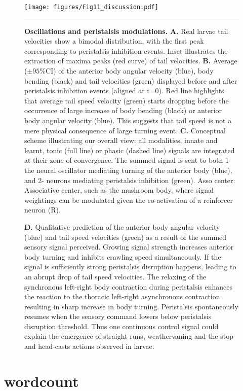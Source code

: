 \documentclass[11pt,a4paper]{article}
\begin{document}
\begin{figure}
\begin{center}
\texttt{[image: figures/Fig11\_discussion.pdf]}
\caption{{\bf Oscillations and peristalsis modulations.} {\bf A.} Real larvae tail velocities show a bimodal distribution, with the first peak corresponding to peristalsis inhibition events. Inset illustrates the extraction of maxima peaks (red curve) of tail velocities.
{\bf B.} Average ($\pm 95\%$CI) of the anterior body angular velocity (blue), body bending (black) and tail velocities (green) displayed before and after peristalsis inhibition events (aligned at t=0). Red line highlights that average tail speed velocity (green) starts dropping before the occurrence of large increase of body bending (black) or anterior body angular velocity (blue). This suggests that tail speed is not a mere physical consequence of large turning event.
{\bf C.} Conceptual scheme illustrating our overall view: all modalities, innate and learnt, tonic (full line) or phasic (dashed line) signals are integrated at their zone of convergence. The summed signal is sent to both 1-the  neural oscillator mediating turning of the anterior body (blue), and 2- neurons mediating peristalsis inhibition (green). Asso center: Associative center, such as the mushroom body, where signal weightings can be modulated given the co-activation of a reinforcer neuron (R).
\label{fig:Peristalsis}}
\hrule
\end{center}
\end{figure}



\begin{figure}
\ContinuedFloat
\caption{
{\bf D.} Qualitative prediction of the anterior body angular velocity (blue) and tail speed velocities (green) as a result of the summed sensory signal perceived. Growing signal strength increases anterior body turning and inhibits crawling speed simultaneously. If the signal is sufficiently strong peristalsis disruption happens, leading to an abrupt drop of tail speed velocities. The relaxing of the synchronous left-right body contraction during peristalsis enhances the reaction to the thoracic left-right asynchronous contraction resulting in sharp increase in body turning. Peristalsis spontaneously resumes when the sensory command lowers below peristalsis disruption threshold. Thus one continuous control signal could explain the emergence of straight runs, weathervaning and the stop and head-casts actions observed in larvae.
}
\end{figure}





\clearpage



%
\section*{wordcount}
\newcommand\wordcount{ }
\wordcount
\end{document}
